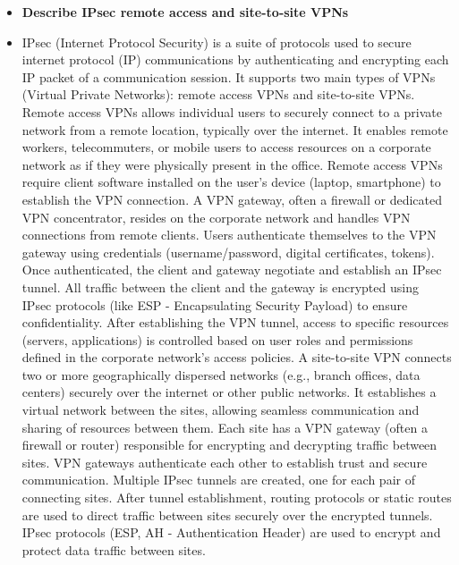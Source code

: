 \documentclass{article}
\begin{document}
\begin{itemize}
  \item \textbf{Describe IPsec remote access and site-to-site VPNs}
  	\item[] IPsec (Internet Protocol Security) is a suite of protocols used to secure internet protocol (IP) communications by authenticating and encrypting each IP packet of a communication session. It supports two main types of VPNs (Virtual Private Networks): remote access VPNs and site-to-site VPNs. Remote access VPNs allows individual users to securely connect to a private network from a remote location, typically over the internet. It enables remote workers, telecommuters, or mobile users to access resources on a corporate network as if they were physically present in the office. Remote access VPNs require client software installed on the user's device (laptop, smartphone) to establish the VPN connection. A VPN gateway, often a firewall or dedicated VPN concentrator, resides on the corporate network and handles VPN connections from remote clients. Users authenticate themselves to the VPN gateway using credentials (username/password, digital certificates, tokens). Once authenticated, the client and gateway negotiate and establish an IPsec tunnel. All traffic between the client and the gateway is encrypted using IPsec protocols (like ESP - Encapsulating Security Payload) to ensure confidentiality. After establishing the VPN tunnel, access to specific resources (servers, applications) is controlled based on user roles and permissions defined in the corporate network's access policies. A site-to-site VPN connects two or more geographically dispersed networks (e.g., branch offices, data centers) securely over the internet or other public networks. It establishes a virtual network between the sites, allowing seamless communication and sharing of resources between them. Each site has a VPN gateway (often a firewall or router) responsible for encrypting and decrypting traffic between sites. VPN gateways authenticate each other to establish trust and secure communication. Multiple IPsec tunnels are created, one for each pair of connecting sites. After tunnel establishment, routing protocols or static routes are used to direct traffic between sites securely over the encrypted tunnels. IPsec protocols (ESP, AH - Authentication Header) are used to encrypt and protect data traffic between sites.
  

\end{itemize}
\end{document}
